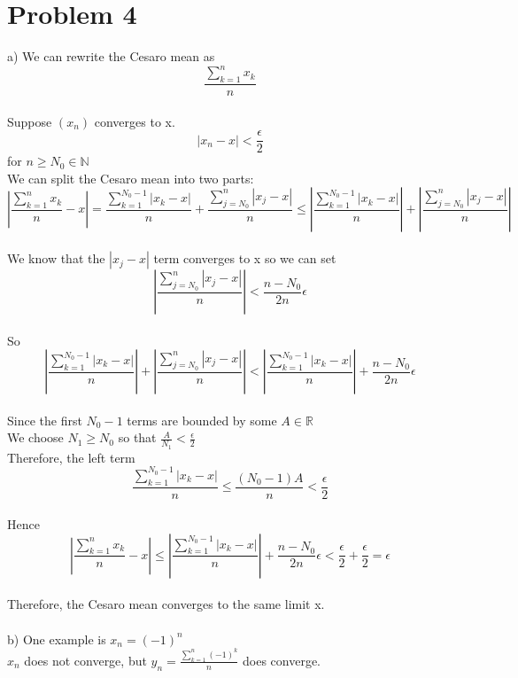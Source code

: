 \documentclass{article}
\begin{document}
\section*{Problem 4}
a) We can rewrite the Cesaro mean as $$\frac{\sum_{k=1}^{n}x_k}{n}$$ \\Suppose $(x_n)$ converges to x.
\\$$|x_n - x| < \frac{\epsilon}{2}$$ for $n \geq N_0 \in \mathbb{N}$
\\We can split the Cesaro mean into two parts: $$|\frac{\sum_{k=1}^{n} x_k}{n} - x| = \frac{\sum_{k=1}^{N_0-1} |x_k - x|}{n} + \frac{\sum_{j=N_0}^{n} |x_j - x|}{n} \leq |\frac{\sum_{k=1}^{N_0-1} |x_k - x|}{n}| + |\frac{\sum_{j=N_0}^{n} |x_j - x|}{n}|$$ 
\\We know that the $|x_j - x|$ term converges to x so we can set $$|\frac{\sum_{j=N_0}^{n} |x_j - x|}{n}| < \frac{n-N_0}{2n}\epsilon$$
\\ So $$|\frac{\sum_{k=1}^{N_0-1} |x_k - x|}{n}| + |\frac{\sum_{j=N_0}^{n} |x_j - x|}{n}| 
< |\frac{\sum_{k=1}^{N_0-1} |x_k - x|}{n}| + \frac{n-N_0}{2n}\epsilon$$
\\Since the first $N_0 - 1$ terms are bounded by some $A \in \mathbb{R}$
\\We choose $N_1 \geq N_0$ so that $\frac{A}{N_1} < \frac{\epsilon}{2}$
\\Therefore, the left term $$\frac{\sum_{k=1}^{N_0-1} |x_k - x|}{n} \leq \frac{(N_0 - 1)A}{n} < \frac{\epsilon}{2}$$
\\Hence $$|\frac{\sum_{k=1}^{n} x_k}{n} - x| \leq |\frac{\sum_{k=1}^{N_0-1} |x_k - x|}{n}| + \frac{n-N_0}{2n}\epsilon < \frac{\epsilon}{2} + \frac{\epsilon}{2} = \epsilon$$
\\Therefore, the Cesaro mean converges to the same limit x.
\\
\\b) One example is $x_n = (-1)^n$
\\$x_n$ does not converge, but $y_n = \frac{\sum_{k=1}^{n}(-1)^k}{n}$ does converge.
\end{document}
